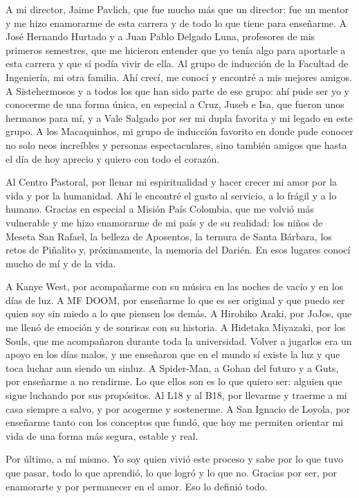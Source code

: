 A mi director, Jaime Pavlich, que fue mucho más que un director: fue un mentor y me hizo enamorarme de esta carrera y de todo lo que tiene para enseñarme. A José Hernando Hurtado y a Juan Pablo Delgado Luna, profesores de mis primeros semestres, que me hicieron entender que yo tenía algo para aportarle a esta carrera y que sí podía vivir de ella. Al grupo de inducción de la Facultad de Ingeniería, mi otra familia. Ahí crecí, me conocí y encontré a mis mejores amigos. A Sistehermosos y a todos los que han sido parte de ese grupo: ahí pude ser yo y conocerme de una forma única, en especial a Cruz, Juseb e Isa, que fueron unos hermanos para mí, y a Vale Salgado por ser mi dupla favorita y mi legado en este grupo. A los Macaquinhos, mi grupo de inducción favorito en donde pude conocer no solo neos increíbles y personas espectaculares, sino también amigos que hasta el día de hoy aprecio y quiero con todo el corazón.

Al Centro Pastoral, por llenar mi espiritualidad y hacer crecer mi amor por la vida y por la humanidad. Ahí le encontré el gusto al servicio, a lo frágil y a lo humano. Gracias en especial a Misión País Colombia, que me volvió más vulnerable y me hizo enamorarme de mi país y de su realidad: los niños de Meseta San Rafael, la belleza de Aposentos, la ternura de Santa Bárbara, los retos de Piñalito y, próximamente, la memoria del Darién. En esos lugares conocí mucho de mí y de la vida.

A Kanye West, por acompañarme con su música en las noches de vacío y en los días de luz. A MF DOOM, por enseñarme lo que es ser original y que puedo ser quien soy sin miedo a lo que piensen los demás. A Hirohiko Araki, por JoJos, que me llenó de emoción y de sonrisas con su historia. A Hidetaka Miyazaki, por los Souls, que me acompañaron durante toda la universidad. Volver a jugarlos era un apoyo en los días malos, y me enseñaron que en el mundo sí existe la luz y que toca luchar aun siendo un sinluz. A Spider-Man, a Gohan del futuro y a Guts, por enseñarme a no rendirme. Lo que ellos son es lo que quiero ser: alguien que sigue luchando por sus propósitos. Al L18 y al B18, por llevarme y traerme a mi casa siempre a salvo, y por acogerme y sostenerme. A San Ignacio de Loyola, por enseñarme tanto con los conceptos que fundó, que hoy me permiten orientar mi vida de una forma más segura, estable y real.

Por último, a mí mismo. Yo soy quien vivió este proceso y sabe por lo que tuvo que pasar, todo lo que aprendió, lo que logró y lo que no. Gracias por ser, por enamorarte y por permanecer en el amor. Eso lo definió todo.

